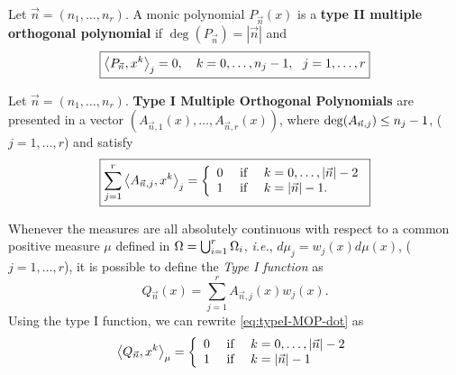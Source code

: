 \documentclass[portrait,final,a0paper,fontscale=0.38]{baposter}
\begin{document}
\begin{poster}
{\begin{multicols}{2}
    \begin{definition}
      Let $\vec n = (n_1,\dots,n_r)$. A monic polynomial $P_{\vec n}(x)$ is a \textbf{type II multiple orthogonal polynomial} if $\deg(P_{\vec n})= |\vec n|$ and 
      \begin{equation}
        \label{eq:typeII-MOP-dot}
        \boxed{\left\langle P_{\vec n} , x^k \right\rangle_j = 0, \ \ \ k=0,\dots,n_{j}-1, \ \ j = 1,\dots,r}
    \end{equation}
  \end{definition}
  \begin{definition}
    \label{def:typeI-univar}
    Let $\vec n = (n_1,\dots,n_r)$. \textbf{Type I Multiple Orthogonal Polynomials} are presented in a vector $(A_{\vec n, 1}(x), \dots, A_{\vec n, r}(x))$, where $\deg(A_{\vec n, j})\leq\nolinebreak n_j-1$, ($j=1,\dots,r$) and satisfy
    \begin{equation}
      \label{eq:typeI-MOP-dot}
      \boxed{\sum_{j=1}^r \left\langle A_{\vec n,j} , x^k \right\rangle_j = \left\{\begin{array}{ccl}
          0 &   \text{ if } & k=0,\dots,|\vec n|-2 \\
          1 & \text{ if } & k=|\vec n|-1.      
      \end{array}\right.}
    \end{equation}
  \end{definition}
  Whenever the measures are all absolutely continuous with respect to a common positive measure $\mu$ defined in $\Omega =\nolinebreak \bigcup_{i=1}^r \Omega_i$, \textit{i.e.}, $d\mu_j = w_j(x) d\mu(x)$, ($j=1,\dots,r$), it is possible to define the \textit{Type I function} as
  \begin{equation}
      \label{eq:typeI-function}
      Q_{\vec n}(x)=\sum_{j=1}^r A_{\vec n,j}(x)w_j(x).
  \end{equation}
  Using the type I function, we can rewrite \eqref{eq:typeI-MOP-dot} as
  \begin{equation}
      \label{eq:typeI-MOP-function}
      \left\langle Q_{\vec n} , x^k \right\rangle_\mu = \left\{\begin{array}{ccl}
          0 &   \text{ if } & k=0,\dots,|\vec n|-2 \\
          1 & \text{ if } & k=|\vec n|-1      
      \end{array}\right.
  \end{equation}
  \end{multicols}
	}
%
%
{

}
\end{poster}
\end{document}
